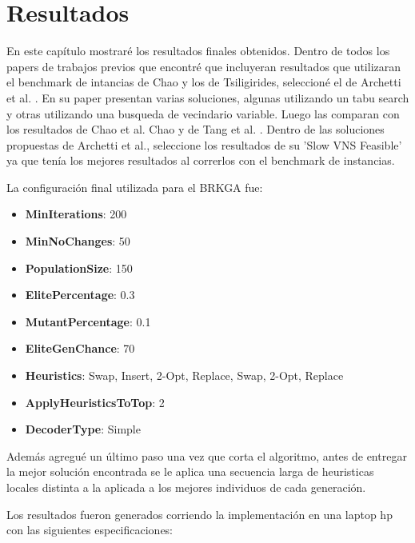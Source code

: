 \chapter{Resultados}


En este capítulo mostraré los resultados finales obtenidos. Dentro de todos los papers de trabajos previos que encontré que incluyeran resultados que utilizaran el benchmark de intancias de Chao y los de Tsiligirides, seleccioné el de Archetti et al. \cite{ArchettiHertzSperanza}. En su paper presentan varias soluciones, algunas utilizando un tabu search y otras utilizando una busqueda de vecindario variable. Luego las comparan con los resultados de Chao et al. Chao \cite{ChaoGoldenWasil} y de Tang et al. \cite{TangMillerHooks}. Dentro de las soluciones propuestas de Archetti et al., seleccione los resultados de su 'Slow VNS Feasible' ya que tenía los mejores resultados al correrlos con el benchmark de instancias. 

\bigskip

La configuración final utilizada para el BRKGA fue:

\begin{itemize}
  \item \textbf{MinIterations}: 200
  \item \textbf{MinNoChanges}: 50
  \item \textbf{PopulationSize}: 150
  \item \textbf{ElitePercentage}: 0.3 
  \item \textbf{MutantPercentage}: 0.1
  \item \textbf{EliteGenChance}: 70 
  \item \textbf{Heuristics}: Swap, Insert, 2-Opt, Replace, Swap, 2-Opt, Replace
  \item \textbf{ApplyHeuristicsToTop}: 2
  \item \textbf{DecoderType}: Simple
\end{itemize}

Además agregué un último paso una vez que corta el algoritmo, antes de entregar la mejor solución encontrada se le aplica una secuencia larga de heuristicas locales distinta a la aplicada a los mejores individuos de cada generación.

\bigskip

Los resultados fueron generados corriendo la implementación en una laptop hp con las siguientes especificaciones:

